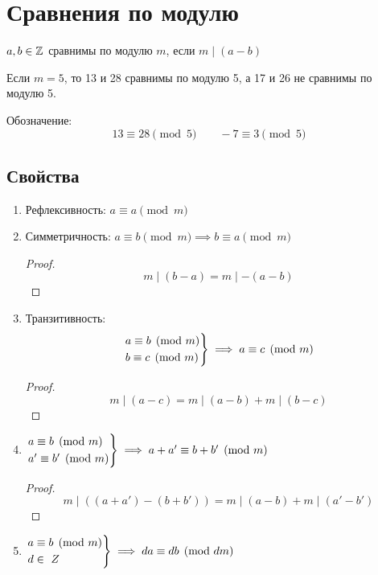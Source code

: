 \documentclass[main]{subfiles}
\begin{document}
\chapter{Сравнения по модулю}
\begin{definition}
    $a, b \in \mathbb{Z}$ сравнимы по модулю $m$, если $m\mid (a-b)$
\end{definition}
\begin{example}
    Если $m=5$, то 13 и 28 сравнимы по модулю 5, а 17 и 26 не сравнимы по модулю 5.
\end{example}

Обозначение: \[13 \equiv 28 \pmod{5} \qquad -7 \equiv 3 \pmod{5}\]
\section{Свойства}
\begin{enumerate}
    \item Рефлексивность: $a\equiv a \pmod{m}$
    \item Симметричность: $a \equiv b \pmod{m} \implies b \equiv a \pmod{m}$
          \begin{proof}
              \[m\mid (b-a) = m \mid -(a-b)\]
          \end{proof}
    \item Транзитивность:
          \[\begin{rcases}
                  a \equiv b \pmod{m} \\
                  b \equiv c \pmod{m}
              \end{rcases} \implies a \equiv c \pmod{m}\]
          \begin{proof}
              \[m\mid (a-c) = m\mid(a-b) + m\mid(b-c)\]
          \end{proof}
    \item $\begin{rcases}
                  a \equiv b \pmod{m} \\
                  a' \equiv b' \pmod{m}
              \end{rcases}\implies a+a' \equiv b+b' \pmod{m}$
          \begin{proof}
              \[m \mid ((a+a')-(b+b')) = m\mid (a-b) + m\mid (a'-b')\]
          \end{proof}
    \item $\begin{rcases}
                  a \equiv b \pmod{m} \\
                  d \in \ Z
              \end{rcases}\implies da \equiv db \pmod{dm}$

\end{enumerate}
\end{document}
